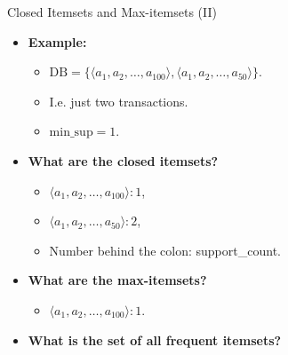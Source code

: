 \begin{frame}{Closed Itemsets and Max-itemsets (II)}
	\begin{itemize}
		\item \textbf{Example:}
		      \begin{itemize}
			      \item $\text{DB} = \{\langle a_1,a_2, \ldots, a_{100} \rangle,
				            \langle a_1, a_2, \ldots, a_{50} \rangle \}$.
			      \item I.e. just two transactions.
			      \item $\text{min\_sup} = 1$.
		      \end{itemize}
		\item \textbf{What are the closed itemsets?}
		      \begin{itemize}
			      \item $\langle a_1,a_2, \ldots, a_{100} \rangle : 1$,
			      \item $\langle a_1,a_2, \ldots, a_{50} \rangle : 2$,
			      \item Number behind the colon: support\_count.
		      \end{itemize}
		\item \textbf{What are the max-itemsets?}
		      \begin{itemize}
			      \item $\langle a_1,a_2, \ldots, a_{100} \rangle : 1$.
		      \end{itemize}
		\item \textbf{What is the set of all frequent itemsets?}
	\end{itemize}
\end{frame}

